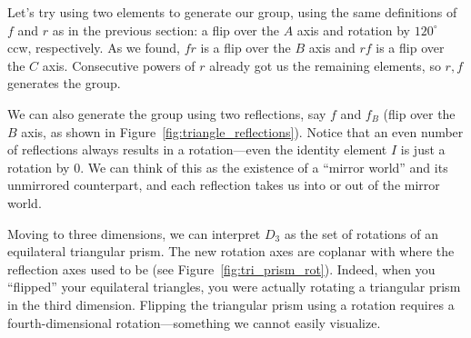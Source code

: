 \documentclass[../gatm.tex]{subfiles}
\begin{document}
Let's try using two elements to generate our group, using the same definitions of $f$ and $r$ as in the previous section: a flip over the $A$ axis and rotation by $120^{\circ}$ ccw, respectively. As we found, $fr$ is a flip over the $B$ axis and $rf$ is a flip over the $C$ axis. Consecutive powers of $r$ already got us the remaining elements, so ${r,f}$ generates the group.

We can also generate the group using two reflections, say $f$ and $f_B$ (flip over the $B$ axis, as shown in Figure~\ref{fig:triangle_reflections}). Notice that an even number of reflections always results in a rotation---even the identity element $I$ is just a rotation by $0$. We can think of this as the existence of a ``mirror world'' and its unmirrored counterpart, and each reflection takes us into or out of the mirror world.

Moving to three dimensions, we can interpret $D_3$ as the set of rotations of an equilateral triangular prism. The new rotation axes are coplanar with where the reflection axes used to be (see Figure~\ref{fig:tri_prism_rot}). Indeed, when you ``flipped'' your equilateral triangles, you were actually rotating a triangular prism in the third dimension. Flipping the triangular prism using a rotation requires a fourth-dimensional rotation---something we cannot easily visualize.
\end{document}
